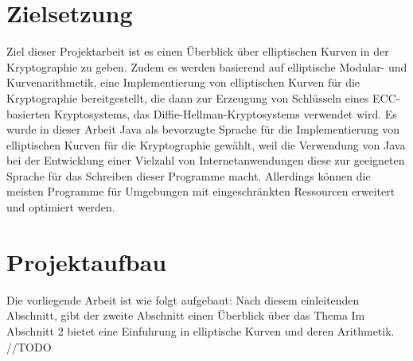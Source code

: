 \section{Zielsetzung}

Ziel dieser Projektarbeit ist es einen Überblick über elliptischen Kurven in der Kryptographie zu geben. Zudem es werden basierend auf elliptische Modular- und Kurvenarithmetik, eine Implementierung von elliptischen Kurven für die Kryptographie bereitgestellt, die dann zur  Erzeugung von Schlüsseln eines ECC-basierten Kryptosystems, das Diffie-Hellman-Kryptosystems verwendet wird. Es wurde in dieser Arbeit Java als bevorzugte Sprache für die Implementierung von elliptischen Kurven für die Kryptographie gewählt, weil die Verwendung von Java bei der Entwicklung einer Vielzahl von Internetanwendungen diese zur geeigneten Sprache für das Schreiben dieser Programme macht. Allerdings können die meisten Programme für Umgebungen mit eingeschränkten Ressourcen erweitert und optimiert werden.

\section{Projektaufbau}


Die vorliegende Arbeit ist wie folgt aufgebaut: Nach diesem einleitenden Abschnitt, gibt der zweite Abschnitt einen Überblick über das Thema
Im Abschnitt 2 bietet eine Einfuhrung in elliptische Kurven und deren Arithmetik. //TODO
